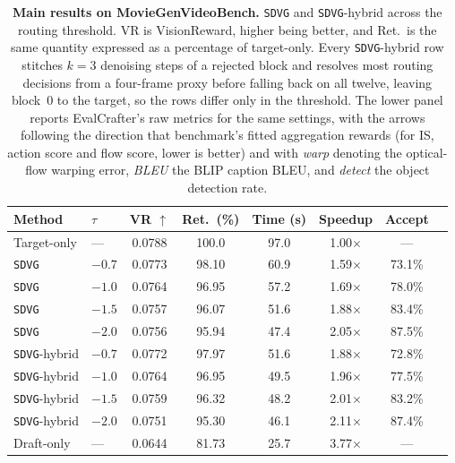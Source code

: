 \documentclass{article} %
\begin{document}
\begin{table}[t]
  \caption{%
    \textbf{Main results on MovieGenVideoBench.}
    \texttt{SDVG} and \texttt{SDVG}-hybrid across the routing threshold.
    VR is VisionReward, higher being better, and Ret.\ is the same
    quantity expressed as a percentage of target-only.
    Every \texttt{SDVG}-hybrid row stitches $k{=}3$ denoising steps of a
    rejected block and resolves most routing decisions from a four-frame
    proxy before falling back on all twelve, leaving block~0 to the
    target, so the rows differ only in the threshold.
    The lower panel reports EvalCrafter's raw metrics for the same
    settings, with the arrows following the direction that benchmark's
    fitted aggregation rewards (for IS, action score and flow score,
    lower is better) and with \emph{warp} denoting the optical-flow
    warping error, \emph{BLEU} the BLIP caption BLEU, and \emph{detect}
    the object detection rate.
  }
  \label{tab:main}
  \centering
  \small
  \begin{tabular*}{0.97\linewidth}{@{\extracolsep{\fill}}llcccccc}
    \toprule
    Method & $\tau$ & VR $\uparrow$ & Ret.\ (\%) & Time (s) & Speedup & Accept \\
    \midrule
    Target-only        & ---    & 0.0788 & 100.0 & 97.0 & 1.00$\times$ & ---    \\
    \midrule
    \texttt{SDVG}      & $-0.7$ & 0.0773 & 98.10 & 60.9 & 1.59$\times$ & 73.1\% \\
    \texttt{SDVG}      & $-1.0$ & 0.0764 & 96.95 & 57.2 & 1.69$\times$ & 78.0\% \\
    \texttt{SDVG}      & $-1.5$ & 0.0757 & 96.07 & 51.6 & 1.88$\times$ & 83.4\% \\
    \texttt{SDVG}      & $-2.0$ & 0.0756 & 95.94 & 47.4 & 2.05$\times$ & 87.5\% \\
    \midrule
    \texttt{SDVG}-hybrid & $-0.7$ & 0.0772 & 97.97 & 51.6 & 1.88$\times$ & 72.8\% \\
    \texttt{SDVG}-hybrid & $-1.0$ & 0.0764 & 96.95 & 49.5 & 1.96$\times$ & 77.5\% \\
    \texttt{SDVG}-hybrid & $-1.5$ & 0.0759 & 96.32 & 48.2 & 2.01$\times$ & 83.2\% \\
    \texttt{SDVG}-hybrid & $-2.0$ & 0.0751 & 95.30 & 46.1 & 2.11$\times$ & 87.4\% \\
    \midrule
    Draft-only         & ---    & 0.0644 & 81.73 & 25.7 & 3.77$\times$ & ---    \\
    \bottomrule
  \end{tabular*}


\end{table}
\end{document}
